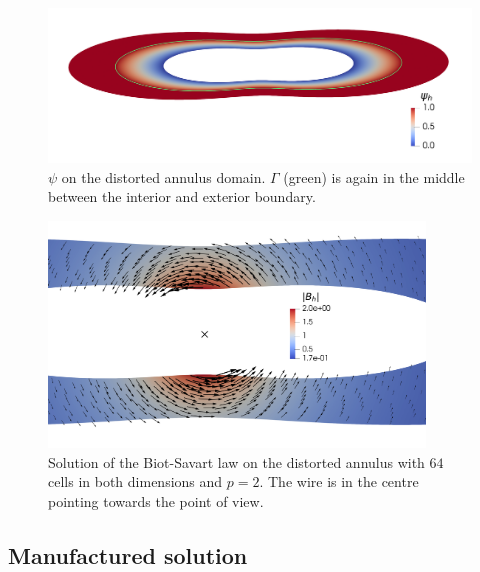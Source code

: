 \documentclass[../master_thesis.tex]{subfiles}
\begin{document}
\begin{figure}
    \centering
    \includegraphics[width=12cm]{plot_files/biot_savart_distorted/psi_h.png}
    \caption{$\psi$ on the distorted annulus domain. $\Gamma$ (green) is again 
        in the middle between the interior and exterior boundary.
    }
    \label{fig:psi_distorted_annulus}
\end{figure}
\begin{figure}
    \centering
    \includegraphics[width=10cm]{plot_files/biot_savart_distorted/B_h_with_cross.png}
    \caption{Solution of the Biot-Savart law on the distorted annulus 
    with $64$ cells in both dimensions and $p=2$. The wire 
    is in the centre pointing towards the point of view.
    }
    \label{fig:distorted_annulus_plot}
\end{figure}

\subsection{Manufactured solution}
\end{document}
